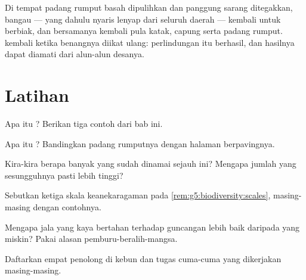 \begin{example}\label{ex:g5:biodiversity:storks}
Di tempat padang rumput basah dipulihkan dan panggung sarang
ditegakkan, bangau --- yang dahulu nyaris lenyap dari seluruh daerah
--- kembali untuk berbiak, dan bersamanya kembali pula katak, capung
serta  padang rumput.  kembali ketika benangnya diikat
ulang: perlindungan itu berhasil, dan hasilnya dapat diamati dari alun-alun
desanya.
\end{example}

\section{Latihan}

\begin{exercise}[$\star$]\label{exo:g5:biodiversity:1}
Apa itu ? Berikan tiga contoh dari bab ini.
\end{exercise}

\begin{exercise}[$\star$]\label{exo:g5:biodiversity:2}
Apa itu ? Bandingkan padang rumputnya dengan
halaman berpavingnya.
\end{exercise}

\begin{exercise}[$\star$]\label{exo:g5:biodiversity:3}
Kira-kira berapa banyak  yang sudah dinamai sejauh ini? Mengapa
jumlah yang sesungguhnya pasti lebih tinggi?
\end{exercise}

\begin{exercise}[$\star$]\label{exo:g5:biodiversity:4}
Sebutkan ketiga skala keanekaragaman pada
\cref{rem:g5:biodiversity:scales}, masing-masing dengan contohnya.
\end{exercise}

\begin{exercise}[$\star$]\label{exo:g5:biodiversity:5}
Mengapa jala yang kaya  bertahan terhadap guncangan lebih baik
daripada yang miskin? Pakai alasan pemburu-beralih-mangsa.
\end{exercise}

\begin{exercise}[$\star$]\label{exo:g5:biodiversity:6}
Daftarkan empat  penolong di kebun  dan tugas cuma-cuma
yang dikerjakan masing-masing.
\end{exercise}

